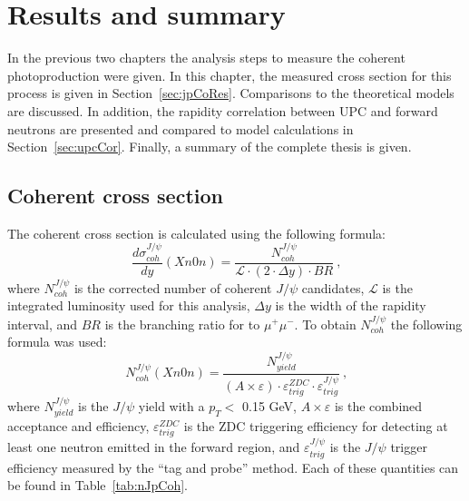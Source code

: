 \chapter{Results and summary}
  In the previous two chapters the analysis steps to measure the coherent
    \JPsi{} photoproduction were given.
  In this chapter, the measured cross section for this process is given
    in Section~\ref{sec:jpCoRes}.
  Comparisons to the theoretical models are discussed. 
  In addition, the rapidity correlation between UPC \JPsi{} and forward
    neutrons are presented and compared to model calculations in 
    Section~\ref{sec:upcCor}. 
  Finally, a summary of the complete thesis is given.  

  \section{Coherent \JPsi{} cross section\label{sec:jpCoRes}}
    The coherent \JPsi{} cross section is calculated using the following
      formula:
    \begin{equation}
    \frac{d\sigma^{J/\psi}_{coh}}{dy} (Xn0n)= \frac{N^{J/\psi}_{coh}}{\mathcal{L} \cdot (2 \cdot \Delta y )\cdot BR}~\textrm{,}
    \label{eq:expXSecCo}
    \end{equation}
      where $N^{J/\psi}_{coh}$ is the corrected number of coherent $J/\psi$
      candidates,  $\mathcal{L}$ is the integrated luminosity used for this 
      analysis, $\Delta y$ is the width of the rapidity interval, and $BR$ is 
      the branching ratio for \JPsi{} to $\mu^{+}\mu^{-}$. 
    To obtain $N^{J/\psi}_{coh}$ the following formula was used:
    \begin{equation}
    N^{J/\psi}_{coh}(Xn0n) = \frac{N^{J/\psi}_{yield}}{(A\times \varepsilon) \cdot \varepsilon^{ZDC}_{trig} \cdot \varepsilon^{J/\psi}_{trig}}~\textrm{,}
    \end{equation}
      where $N^{J/\psi}_{yield}$ is the $J/\psi$ yield with a $p_{T} <$ 0.15 
      GeV, $A\times \varepsilon$ is the combined acceptance and efficiency, 
      $\varepsilon^{ZDC}_{trig}$ is the ZDC triggering efficiency for detecting
      at least one neutron emitted in the forward region, and 
      $\varepsilon^{J/\psi}_{trig}$ is the $J/\psi$ trigger efficiency measured
      by the ``tag and probe'' method. 
    Each of these quantities can be found in Table~\ref{tab:nJpCoh}.
